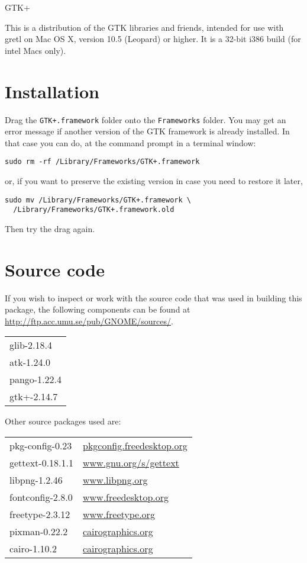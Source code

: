 \documentclass[11pt]{article}
\begin{document}
\thispagestyle{empty}

\begin{center}
{\color{gold} \gtkfont GTK+}
\end{center}

This is a distribution of the GTK libraries and friends, intended for
use with gretl on Mac OS X, version 10.5 (Leopard) or higher.
It is a 32-bit i386 build (for intel Macs only).

\section{Installation}

Drag the \texttt{GTK+.framework} folder onto the \texttt{Frameworks}
folder. You may get an error message if another version of the GTK
framework is already installed. In that case you can do, at the
command prompt in a terminal window:

\verb|sudo rm -rf /Library/Frameworks/GTK+.framework|

or, if you want to preserve the existing version in case you need to
restore it later,
\begin{verbatim}
sudo mv /Library/Frameworks/GTK+.framework \
  /Library/Frameworks/GTK+.framework.old
\end{verbatim}

Then try the drag again.

\section{Source code}

If you wish to inspect or work with the source code that was used in
building this package, the following components can be found at
\url{http://ftp.acc.umu.se/pub/GNOME/sources/}.

\begin{tabular}{l}
glib-2.18.4 \\
atk-1.24.0 \\
pango-1.22.4 \\
gtk+-2.14.7 \\
\end{tabular}

Other source packages used are:

\begin{tabular}{ll}
pkg-config-0.23 & \url{pkgconfig.freedesktop.org} \\
gettext-0.18.1.1 & \url{www.gnu.org/s/gettext} \\
libpng-1.2.46 & \url{www.libpng.org} \\
fontconfig-2.8.0 & \url{www.freedesktop.org} \\
freetype-2.3.12 & \url{www.freetype.org} \\
pixman-0.22.2 & \url{cairographics.org} \\
cairo-1.10.2 & \url{cairographics.org} \\
\end{tabular}
\end{document}
